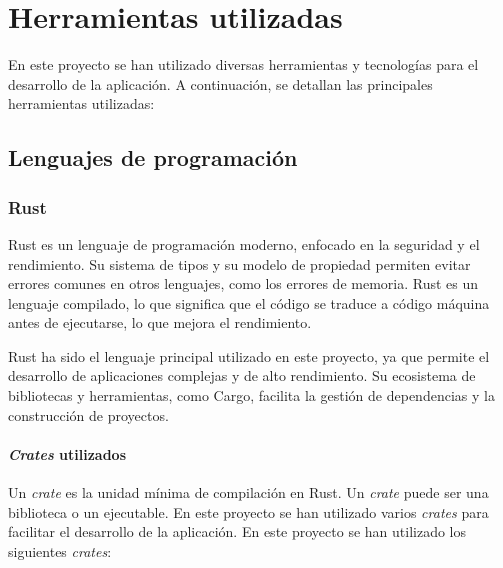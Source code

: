 \chapter{Herramientas utilizadas}

\noindent En este proyecto se han utilizado diversas herramientas y tecnologías para el desarrollo de la aplicación. A continuación, se detallan las principales herramientas utilizadas:

\section{Lenguajes de programación}

\subsection{Rust}

Rust es un lenguaje de programación moderno, enfocado en la seguridad y el rendimiento. Su sistema de tipos y su modelo de propiedad permiten evitar errores comunes en otros lenguajes, como los errores de memoria. Rust es un lenguaje compilado, lo que significa que el código se traduce a código máquina antes de ejecutarse, lo que mejora el rendimiento.

Rust ha sido el lenguaje principal utilizado en este proyecto, ya que permite el desarrollo de aplicaciones complejas y de alto rendimiento. Su ecosistema de bibliotecas y herramientas, como Cargo, facilita la gestión de dependencias y la construcción de proyectos.

\subsubsection{\textit{Crates} utilizados}

Un \textit{crate} es la unidad mínima de compilación en Rust. Un \textit{crate} puede ser una biblioteca o un ejecutable. En este proyecto se han utilizado varios \textit{crates} para facilitar el desarrollo de la aplicación. En este proyecto se han utilizado los siguientes \textit{crates}:

